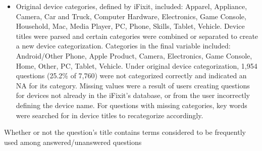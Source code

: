 \documentclass{article}
\begin{document}
\begin{itemize}
  \item Original device categories, defined by iFixit, included: Apparel, Appliance, Camera, Car and Truck, Computer Hardware, Electronics, Game Console, Household, Mac, Media Player, PC, Phone, Skills, Tablet, Vehicle. Device titles were parsed and certain categories were combined or separated to create a new device categorization. Categories in the final variable included: Android/Other Phone, Apple Product, Camera, Electronics, Game Console, Home, Other, PC, Tablet, Vehicle. Under original device categorization, 1,954 questions (25.2\% of 7,760) were not categorized correctly and indicated an NA for its category. Missing values were a result of users creating questions for devices not already in the iFixit's database, or from the user incorrectly defining the device name. For questions with missing categories, key words were searched for in device titles to recategorize accordingly. 
\end{itemize}


Whether or not the question's title contains terms considered to be frequently used among answered/unanswered questions
\end{document}
